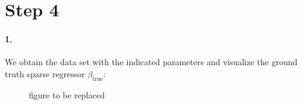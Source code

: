 \section*{Step 4}
\paragraph{1.}
We obtain the data set with the indicated parameters and visualize the ground truth sparse regressor $\beta_\text{true}:$
\begin{figure}[H]
        \centering
       \caption{ figure to be replaced }
\label{fig:1-reall23}
\end{figure} 

